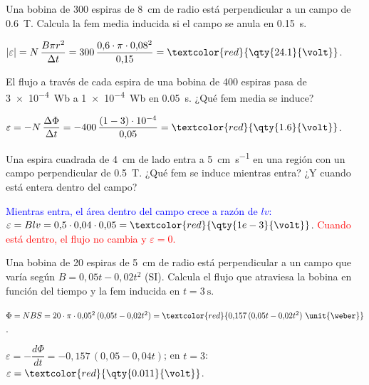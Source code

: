 \begin{exercise}
    Una bobina de 300 espiras de \qty{8}{\cm} de radio está perpendicular a un campo de \qty{0.6}{\tesla}. Calcula la fem media inducida si el
    campo se anula en \qty{0.15}{\second}.
    \begin{solu}
        \(|\varepsilon| = N\,\dfrac{B\pi r^2}{\Delta t} = 300\,\dfrac{0{,}6\cdot\pi\cdot 0{,}08^2}{0{,}15} = \textcolor{red}{\qty{24.1}{\volt}}\).
    \end{solu}
\end{exercise}

\begin{exercise}
    El flujo a través de cada espira de una bobina de 400 espiras pasa de \qty{3e-4}{\weber} a \qty{1e-4}{\weber} en \qty{0.05}{\second}. ¿Qué fem media se induce?
    \begin{solu}
        \(\varepsilon = -N\,\dfrac{\Delta\Phi}{\Delta t} = -400\,\dfrac{(1 - 3)\cdot 10^{-4}}{0{,}05} = \textcolor{red}{\qty{1.6}{\volt}}\).
    \end{solu}
\end{exercise}

\begin{exercise}
    Una espira cuadrada de \qty{4}{\cm} de lado entra a \qty{5}{\cm\per\second} en una región con un campo perpendicular de \qty{0.5}{\tesla}.
    ¿Qué fem se induce mientras entra? ¿Y cuando está entera dentro del campo?
    \begin{solu}
        \textcolor{blue}{Mientras entra, el área dentro del campo crece a razón de \(lv\):} \(\varepsilon = B l v = 0{,}5\cdot 0{,}04\cdot 0{,}05 = \textcolor{red}{\qty{1e-3}{\volt}}\).
        \textcolor{red}{Cuando está dentro, el flujo no cambia y \(\varepsilon = 0\).}
    \end{solu}
\end{exercise}

\begin{exercise}
    Una bobina de 20 espiras de \qty{5}{\cm} de radio está perpendicular a un campo que varía según \(B = 0{,}05t - 0{,}02t^2\) (SI). Calcula el
    flujo que atraviesa la bobina en función del tiempo y la fem inducida en \(t = \qty{3}{\second}\).
    \begin{solu}
        \(\Phi = N B S = 20\cdot\pi\cdot 0{,}05^2\,(0{,}05t - 0{,}02t^2) = \textcolor{red}{0{,}157\,(0{,}05t - 0{,}02t^2)\ \unit{\weber}}\).

        \(\varepsilon = -\dfrac{d\Phi}{dt} = -0{,}157\,(0{,}05 - 0{,}04t)\); en \(t = 3\): \(\varepsilon = \textcolor{red}{\qty{0.011}{\volt}}\).
    \end{solu}
\end{exercise}

